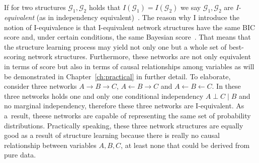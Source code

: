 \documentclass[english,cover]{fitthesis} %
\newcommand{\term}[1]{\emph{#1}}           %
\begin{document}
If for two structures $\mathcal{G}_1, \mathcal{G}_2$ holds that $I(\mathcal{G}_1) = I(\mathcal{G}_2)$ we say $\mathcal{G}_1, \mathcal{G}_2$ are \term{I-equivalent} (as in independency equivalent)~\cite[p.~76]{pgm}. The reason why I introduce the notion of I-equivalence is that I-equivalent network structures have the same BIC score and, under certain conditions, the same Bayesian score~\cite[p.~807]{pgm}. That means that the structure learning process may yield not only one but a whole set of best-scoring network structures. Furthermore, these networks are not only equivalent in terms of score but also in terms of causal relationships among variables as will be demonstrated in Chapter~\ref{ch:practical} in further detail. To elaborate, consider three networks $A \rightarrow B \rightarrow C$, $A \leftarrow B \rightarrow C$ and $A \leftarrow B \leftarrow C$. In these three networks holds one and only one conditional independency $A \perp C \mid B$ and no marginal independency, therefore these three networks are I-equivalent. As a~result, theese networks are capable of representing the same set of probability distributions. Practically speaking, these three network structures are equally good as a result of structure learning because there is really no causal relationship between variables $A,B,C$, at least none that could be derived from pure data.
\end{document}
